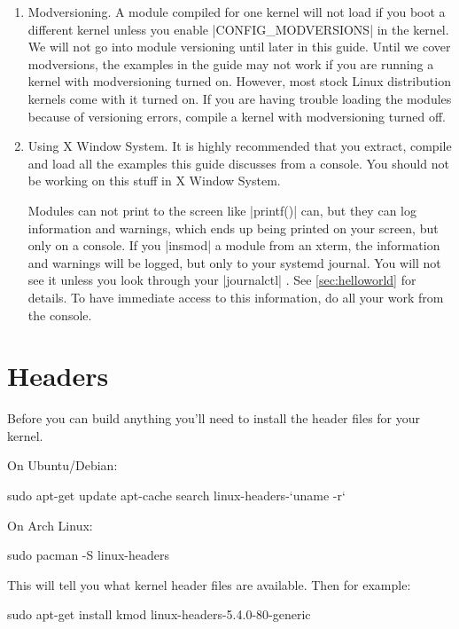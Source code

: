 \documentclass[10pt, oneside]{book}
\begin{document}
\begin{enumerate}
  \item Modversioning.
        A module compiled for one kernel will not load if you boot a different kernel unless you enable \cpp|CONFIG_MODVERSIONS| in the kernel.
        We will not go into module versioning until later in this guide.
        Until we cover modversions, the examples in the guide may not work if you are running a kernel with modversioning turned on.
        However, most stock Linux distribution kernels come with it turned on.
        If you are having trouble loading the modules because of versioning errors, compile a kernel with modversioning turned off.

  \item Using X Window System.
  \label{sec:using_x}
        It is highly recommended that you extract, compile and load all the examples this guide discusses from a console.
        You should not be working on this stuff in X Window System.

        Modules can not print to the screen like \cpp|printf()| can, but they can log information and warnings, which ends up being printed on your screen, but only on a console.
        If you \sh|insmod| a module from an xterm, the information and warnings will be logged, but only to your systemd journal.
        You will not see it unless you look through your \sh|journalctl| .
        See \ref{sec:helloworld} for details.
        To have immediate access to this information, do all your work from the console.
\end{enumerate}

\section{Headers}
\label{sec:headers}
Before you can build anything you'll need to install the header files for your kernel.

On Ubuntu/Debian:
\begin{codebash}
sudo apt-get update
apt-cache search linux-headers-`uname -r`
\end{codebash}

On Arch Linux:
\begin{codebash}
sudo pacman -S linux-headers
\end{codebash}

This will tell you what kernel header files are available.
Then for example:
\begin{codebash}
sudo apt-get install kmod linux-headers-5.4.0-80-generic
\end{codebash}
\end{document}
